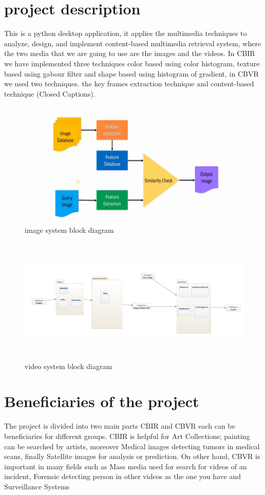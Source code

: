 \documentclass[pdftex,10pt,a4paper,oneside]{article}
\begin{document}
	\section{project description}
	This is a python desktop application, it applies the multimedia techniques to analyze, design, and implement content-based multimedia retrieval system, where the two media that we are going to use are the images and the videos. In CBIR we have implemented three techniques color based using color histogram, texture based using gabour filter and shape based using histogram of gradient, in CBVR we used two techniques. the key frames extraction technique and content-based technique (Closed Captions).
	\begin{figure}[H]
		\centering
		\includegraphics[width=120mm,height=60mm]{fig/19.png}
		\caption{image system block diagram }
		\label{image system block diagram}
	\end{figure}
	\begin{figure}[H]
	\centering
	\includegraphics[width=120mm,height=60mm]{fig/22.png}
	\caption{video system block diagram }
	\label{video system block diagram}
\end{figure}
	\pagebreak
	\section{Beneficiaries of the project}
	The project is divided into two main parts CBIR and CBVR each can be beneficiaries for different groups.
	CBIR is helpful for Art Collections; painting can be searched by artists, moreover Medical images detecting tumors in medical scans, finally Satellite images for analysis or prediction.
	On other hand, CBVR is important in many fields such as Mass media used for search for videos of an incident, Forensic detecting person in other videos as the one you have and Surveillance Systems
	
\end{document}
